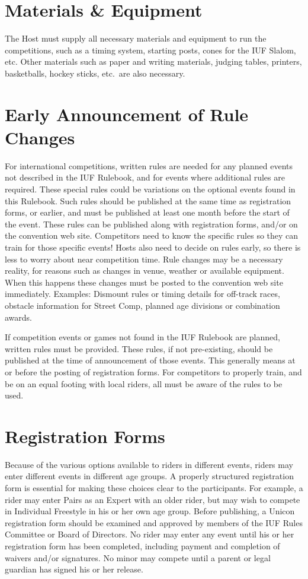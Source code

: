 \section{Materials \& Equipment}
The Host must supply all necessary materials and equipment to run the competitions, such as a timing system, starting posts, cones for the IUF Slalom, etc.
Other materials such as paper and writing materials, judging tables, printers, basketballs, hockey sticks, etc.\ are also necessary.

\section{Early Announcement of Rule Changes}
For international competitions, written rules are needed for any planned events not described in the IUF Rulebook, and for events where additional rules are required.
These special rules could be variations on the optional events found in this Rulebook.
Such rules should be published at the same time as registration forms, or earlier, and must be published at least one month before the start of the event.
These rules can be published along with registration forms, and/or on the convention web site.
Competitors need to know the specific rules so they can train for those specific events!
Hosts also need to decide on rules early, so there is less to worry about near competition time.
Rule changes may be a necessary reality, for reasons such as changes in venue, weather or available equipment.
When this happens these changes must be posted to the convention web site immediately.
Examples: Dismount rules or timing details for off-track races, obstacle information for Street Comp, planned age divisions or combination awards.

If competition events or games not found in the IUF Rulebook are planned, written rules must be provided.
These rules, if not pre-existing, should be published at the time of announcement of those events.
This generally means at or before the posting of registration forms.
For competitors to properly train, and be on an equal footing with local riders, all must be aware of the rules to be used.

\section{Registration Forms}
Because of the various options available to riders in different events, riders may enter different events in different age groups.
A properly structured registration form is essential for making these choices clear to the participants.
For example, a rider may enter Pairs as an Expert with an older rider, but may wish to compete in Individual Freestyle in his or her own age group.
Before publishing, a Unicon registration form should be examined and approved by members of the IUF Rules Committee or Board of Directors.
No rider may enter any event until his or her registration form has been completed, including payment and completion of waivers and/or signatures.
No minor may compete until a parent or legal guardian has signed his or her release.

